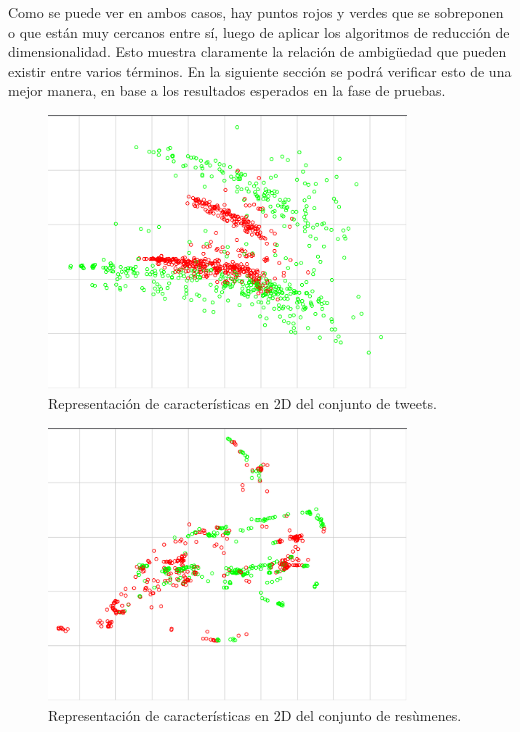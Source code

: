 Como se puede ver en ambos casos, hay puntos rojos y verdes que se sobreponen o que están muy cercanos entre sí, luego de aplicar los algoritmos de reducción de dimensionalidad. Esto muestra claramente la relación de ambigüedad que pueden existir entre varios términos. En la siguiente sección se podrá verificar esto de una mejor manera, en base a los resultados esperados en la fase de pruebas. 


\begin{figure}[h!]
	\begin{center}
	\includegraphics[angle=0,width=9.5cm]{Graficos/knn_train}
	\caption{Representación de características en 2D del conjunto de tweets.}
	\label{fig:knn_train}
  \end{center}
\end{figure}

\begin{figure}[h!]
	\begin{center}
	\includegraphics[angle=0,width=9.5cm]{Graficos/knn_test}
	\caption{Representación de características en 2D del conjunto de resùmenes.}
	\label{fig:knn_test}
  \end{center}
\end{figure}

